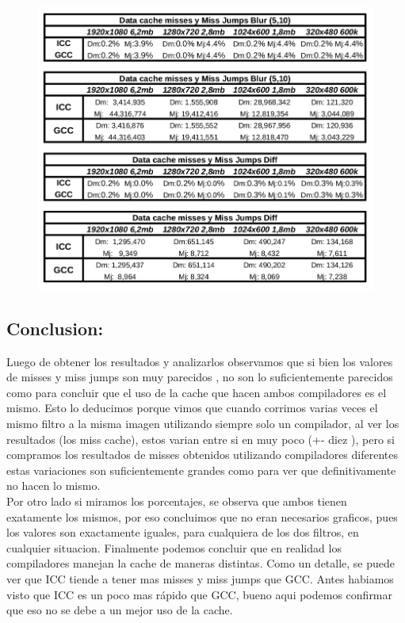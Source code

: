 \begin{figure}[H]
\begin{center}
  \includegraphics[width=\linewidth]{cachecompiladores/tabla.png}
\end{center}
\end{figure}

\subsection{Conclusion:}

Luego de obtener los resultados y analizarlos observamos que si bien los valores de misses y miss jumps son muy parecidos , no son lo suficientemente parecidos como para concluir que el uso de la cache que hacen ambos compiladores es el mismo. Esto lo deducimos porque vimos que cuando corrimos varias veces el mismo filtro a la misma imagen utilizando siempre solo un compilador, al ver los resultados (los miss cache), estos varian entre si en muy poco (+- diez ), pero si compramos los resultados de misses obtenidos utilizando compiladores diferentes estas variaciones son suficientemente grandes como para ver que definitivamente no hacen lo mismo. \\

Por otro lado si miramos los porcentajes, se observa que ambos tienen exatamente los mismos, por eso concluimos que no eran necesarios graficos, pues los valores son exactamente iguales, para cualquiera de los dos filtros, en cualquier situacion. Finalmente podemos concluir que en realidad los compiladores manejan la cache de maneras distintas. Como un detalle, se puede ver que ICC tiende a tener mas misses y miss jumps que GCC. Antes habiamos visto que ICC es un poco mas rápido que GCC, bueno aqui podemos confirmar que eso no se debe a un mejor uso de la cache.